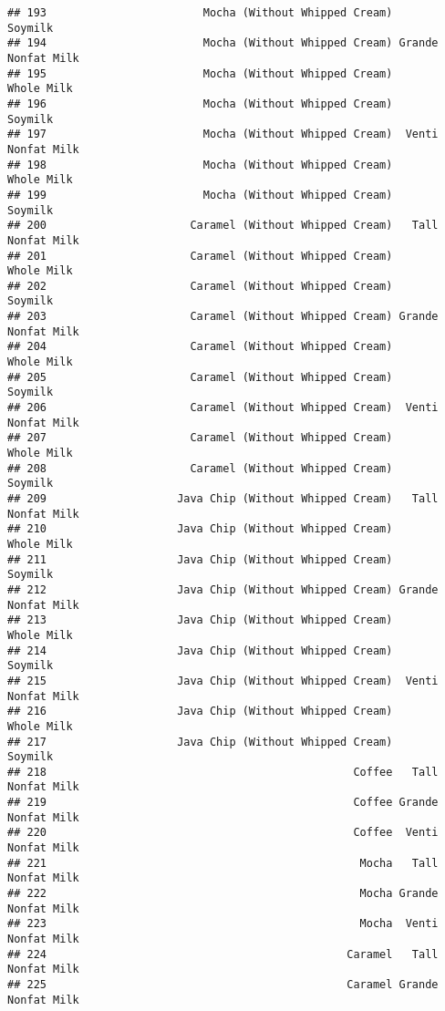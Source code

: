 \documentclass[
]{article}
\begin{document}
\begin{verbatim}
## 193                        Mocha (Without Whipped Cream)            Soymilk
## 194                        Mocha (Without Whipped Cream) Grande Nonfat Milk
## 195                        Mocha (Without Whipped Cream)         Whole Milk
## 196                        Mocha (Without Whipped Cream)            Soymilk
## 197                        Mocha (Without Whipped Cream)  Venti Nonfat Milk
## 198                        Mocha (Without Whipped Cream)         Whole Milk
## 199                        Mocha (Without Whipped Cream)            Soymilk
## 200                      Caramel (Without Whipped Cream)   Tall Nonfat Milk
## 201                      Caramel (Without Whipped Cream)         Whole Milk
## 202                      Caramel (Without Whipped Cream)            Soymilk
## 203                      Caramel (Without Whipped Cream) Grande Nonfat Milk
## 204                      Caramel (Without Whipped Cream)         Whole Milk
## 205                      Caramel (Without Whipped Cream)            Soymilk
## 206                      Caramel (Without Whipped Cream)  Venti Nonfat Milk
## 207                      Caramel (Without Whipped Cream)         Whole Milk
## 208                      Caramel (Without Whipped Cream)            Soymilk
## 209                    Java Chip (Without Whipped Cream)   Tall Nonfat Milk
## 210                    Java Chip (Without Whipped Cream)         Whole Milk
## 211                    Java Chip (Without Whipped Cream)            Soymilk
## 212                    Java Chip (Without Whipped Cream) Grande Nonfat Milk
## 213                    Java Chip (Without Whipped Cream)         Whole Milk
## 214                    Java Chip (Without Whipped Cream)            Soymilk
## 215                    Java Chip (Without Whipped Cream)  Venti Nonfat Milk
## 216                    Java Chip (Without Whipped Cream)         Whole Milk
## 217                    Java Chip (Without Whipped Cream)            Soymilk
## 218                                               Coffee   Tall Nonfat Milk
## 219                                               Coffee Grande Nonfat Milk
## 220                                               Coffee  Venti Nonfat Milk
## 221                                                Mocha   Tall Nonfat Milk
## 222                                                Mocha Grande Nonfat Milk
## 223                                                Mocha  Venti Nonfat Milk
## 224                                              Caramel   Tall Nonfat Milk
## 225                                              Caramel Grande Nonfat Milk

\end{verbatim}
\end{document}
